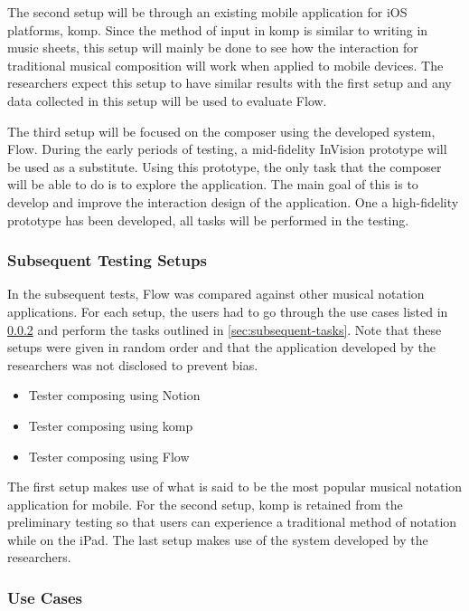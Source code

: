 				The second setup will be through an existing mobile application for iOS platforms, komp. Since the method of input in komp is similar to writing in music sheets, this setup will mainly be done to see how the interaction for traditional musical composition will work when applied to mobile devices. The researchers expect this setup to have similar results with the first setup and any data collected in this setup will be used to evaluate Flow.

				The third setup will be focused on the composer using the developed system, Flow. During the early periods of testing, a mid-fidelity InVision prototype will be used as a substitute. Using this prototype, the only task that the composer will be able to do is to explore the application. The main goal of this is to develop and improve the interaction design of the application. One a high-fidelity prototype has been developed, all tasks will be performed in the testing.

			\subsubsection{Subsequent Testing Setups}

				In the subsequent tests, Flow was compared against other musical notation applications. For each setup, the users had to go through the use cases listed in \ref{sec:use-cases} and perform the tasks outlined in \ref{sec:subsequent-tasks}. Note that these setups were given in random order and that the application developed by the researchers was not disclosed to prevent bias.

				\begin{itemize}
					\item Tester composing using Notion
					\item Tester composing using komp
					\item Tester composing using Flow
				\end{itemize}

				The first setup makes use of what is said to be the most popular musical notation application for mobile. For the second setup, komp is retained from the preliminary testing so that users can experience a traditional method of notation while on the iPad. The last setup makes use of the system developed by the researchers.

			\subsubsection{Use Cases}
			\label{sec:use-cases}

